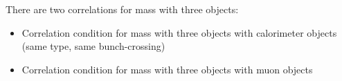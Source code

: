 There are two correlations for mass with three objects:
\begin{itemize}
\item Correlation condition for mass with three objects with calorimeter objects (same type, same bunch-crossing)\\
\item Correlation condition for mass with three objects with muon objects\\
\end{itemize}

%
%
